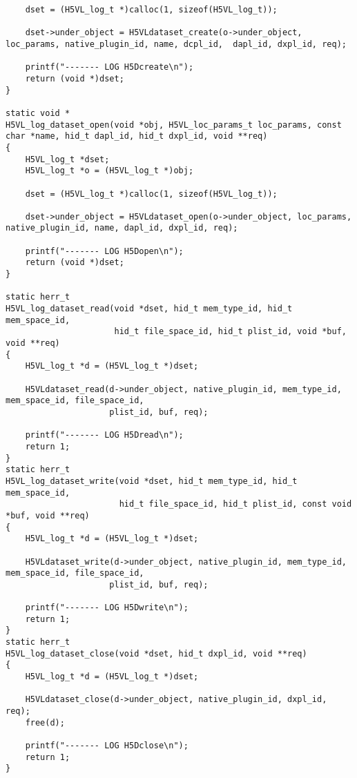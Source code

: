 \begin{lstlisting}
    dset = (H5VL_log_t *)calloc(1, sizeof(H5VL_log_t));

    dset->under_object = H5VLdataset_create(o->under_object, loc_params, native_plugin_id, name, dcpl_id,  dapl_id, dxpl_id, req);

    printf("------- LOG H5Dcreate\n");
    return (void *)dset;
}

static void *
H5VL_log_dataset_open(void *obj, H5VL_loc_params_t loc_params, const char *name, hid_t dapl_id, hid_t dxpl_id, void **req)
{
    H5VL_log_t *dset;
    H5VL_log_t *o = (H5VL_log_t *)obj;

    dset = (H5VL_log_t *)calloc(1, sizeof(H5VL_log_t));

    dset->under_object = H5VLdataset_open(o->under_object, loc_params, native_plugin_id, name, dapl_id, dxpl_id, req);

    printf("------- LOG H5Dopen\n");
    return (void *)dset;
}

static herr_t 
H5VL_log_dataset_read(void *dset, hid_t mem_type_id, hid_t mem_space_id,
                      hid_t file_space_id, hid_t plist_id, void *buf, void **req)
{
    H5VL_log_t *d = (H5VL_log_t *)dset;

    H5VLdataset_read(d->under_object, native_plugin_id, mem_type_id, mem_space_id, file_space_id, 
                     plist_id, buf, req);

    printf("------- LOG H5Dread\n");
    return 1;
}
static herr_t 
H5VL_log_dataset_write(void *dset, hid_t mem_type_id, hid_t mem_space_id,
                       hid_t file_space_id, hid_t plist_id, const void *buf, void **req)
{
    H5VL_log_t *d = (H5VL_log_t *)dset;

    H5VLdataset_write(d->under_object, native_plugin_id, mem_type_id, mem_space_id, file_space_id, 
                     plist_id, buf, req);

    printf("------- LOG H5Dwrite\n");
    return 1;
}
static herr_t 
H5VL_log_dataset_close(void *dset, hid_t dxpl_id, void **req)
{
    H5VL_log_t *d = (H5VL_log_t *)dset;

    H5VLdataset_close(d->under_object, native_plugin_id, dxpl_id, req);
    free(d);

    printf("------- LOG H5Dclose\n");
    return 1;
}
\end{lstlisting}

